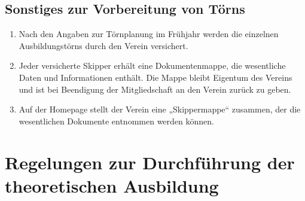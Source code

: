 \documentclass[10pt, twocolumn, parskip=half]{scrartcl}
\begin{document}
\subsection{Sonstiges zur Vorbereitung von Törns}
\begin{enumerate}[noitemsep]
	\item Nach den Angaben zur Törnplanung im Frühjahr werden die einzelnen Ausbildungstörns durch den Verein versichert.
	\item Jeder versicherte Skipper erhält eine Dokumentenmappe, die wesentliche Daten und Informationen enthält. Die Mappe bleibt Eigentum des Vereins und ist bei Beendigung der Mitgliedschaft an den Verein zurück zu geben.
	\item Auf der Homepage stellt der Verein eine „Skippermappe“ zusammen, der die wesentlichen Dokumente entnommen werden können.	
\end{enumerate}

\section*{Regelungen zur Durchführung der theoretischen Ausbildung}
\end{document}
